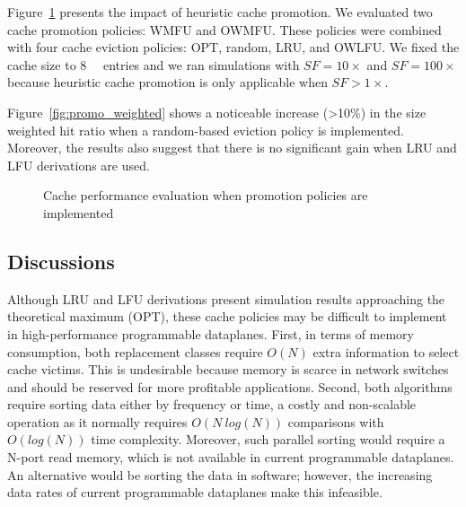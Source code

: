 Figure~\ref{fig:promo_fig} presents the impact of heuristic cache promotion. 
We evaluated two cache promotion policies: WMFU and OWMFU.
These policies were combined with four cache eviction policies: OPT, random, LRU, and OWLFU.
We fixed the cache size to \SI{8}{\kilo\nothing} entries and we ran simulations with $SF=10\times$ and $SF=100\times$ because heuristic cache promotion is only applicable when $SF>1\times$.

Figure~\ref{fig:promo_weighted} shows a noticeable increase (>10\%) in the size weighted hit ratio when a random-based eviction policy is implemented.
Moreover, the results also suggest that there is no significant gain when LRU and LFU derivations are used.

\begin{figure}[t]
	\centering
	\caption{Cache performance evaluation when promotion policies are implemented}
	\label{fig:promo_fig}
\end{figure}

\subsection{Discussions}

Although LRU and LFU derivations present simulation results approaching the theoretical maximum (OPT), these cache policies may be difficult to implement in high-performance programmable dataplanes.
First, in terms of memory consumption, both replacement classes require $O(N)$ extra information to select cache victims.
This is undesirable because memory is scarce in network switches and should be reserved for more profitable applications.
Second, both algorithms require sorting data either by frequency or time, a costly and non-scalable operation as it normally requires $O(N~log(N))$ comparisons with $O(log(N))$ time complexity.
Moreover, such parallel sorting would require a N-port read memory, which is not available in current programmable dataplanes.
An alternative would be sorting the data in software; however, the increasing data rates of current programmable dataplanes make this infeasible.  

